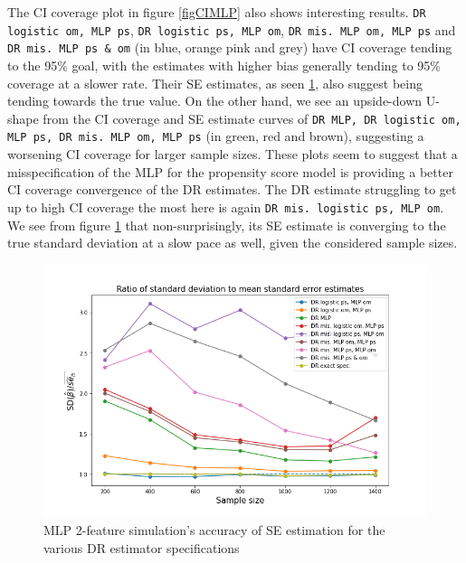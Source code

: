\documentclass[12pt,twoside]{article}
\begin{document}
The CI coverage plot in figure \ref{figCIMLP} also shows interesting results. \texttt{DR logistic om, MLP ps}, \texttt{DR logistic ps, MLP om}, \texttt{DR mis. MLP om, MLP ps} and \texttt{DR mis. MLP ps \& om} (in blue, orange pink and grey) have CI coverage tending to the 95\% goal, with the estimates with higher bias generally tending to 95\% coverage at a slower rate. Their SE estimates, as seen \ref{figSEMLP}, also suggest being tending towards the true value. On the other hand, we see an upside-down U-shape from the CI coverage and SE estimate curves of \texttt{DR MLP, DR logistic om, MLP ps, DR mis. MLP om, MLP ps} (in green, red and brown), suggesting a worsening CI coverage for larger sample sizes. These plots seem to suggest that a misspecification of the MLP for the propensity score model is providing a better CI coverage convergence of the DR estimates. The DR estimate struggling to get up to high CI coverage the most here is again \texttt{DR mis. logistic ps, MLP om}. We see from figure \ref{figSEMLP} that non-surprisingly, its SE estimate is converging to the true standard deviation at a slow pace as well, given the considered sample sizes. 

\begin{figure}[h!]
    \centering
    \includegraphics[width = 0.9\columnwidth]{figures/SEMLP.png}
    \caption{MLP 2-feature simulation's accuracy of \citet{lunceford_davidian} SE estimation for the various DR estimator specifications}
    \label{figSEMLP}
\end{figure}
\end{document}
